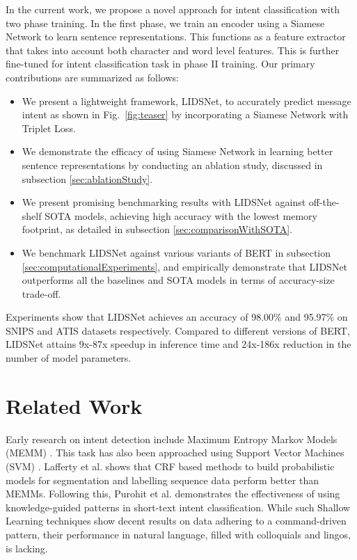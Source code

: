 \documentclass[conference]{IEEEtran}
\begin{document}
In the current work, we propose a novel approach for intent classification with two phase training. In the first phase, we train an encoder using a Siamese Network to learn sentence representations. This functions as a feature extractor that takes into account both character and word level features. This is further fine-tuned for intent classification task in phase II training. Our primary contributions are summarized as follows:

\begin{itemize}
	\item We present a lightweight framework, LIDSNet, to accurately predict message intent as shown in Fig.~\ref{fig:teaser} by incorporating a Siamese Network with Triplet Loss.
	\item We demonstrate the efficacy of using Siamese Network in learning better sentence representations by conducting an ablation study, discussed in subsection \ref{sec:ablationStudy}.
	\item We present promising benchmarking results with LIDSNet against off-the-shelf SOTA models, achieving high accuracy with the lowest memory footprint, as detailed in subsection \ref{sec:comparisonWithSOTA}.
	\item We benchmark LIDSNet against various variants of BERT in subsection \ref{sec:computationalExperiments}, and empirically demonstrate that LIDSNet outperforms all the baselines and SOTA models in terms of accuracy-size trade-off.
\end{itemize}

Experiments show that LIDSNet achieves an accuracy of 98.00\% and 95.97\% on SNIPS and ATIS datasets respectively. Compared to different versions of BERT, LIDSNet attains 9x-87x speedup in inference time and 24x-186x reduction in the number of model parameters.

\section{Related Work}\label{sec:relatedWork}

Early research on intent detection include Maximum Entropy Markov Models (MEMM) \cite{toutanvoa-manning-2000-enriching}. This task has also been approached using Support Vector Machines (SVM) \cite{5947649}. Lafferty et al. \cite{10.5555/645530.655813} shows that CRF based methods to build probabilistic models for segmentation and labelling sequence data perform better than MEMMs. Following this, Purohit et al. \cite{7463729} demonstrates the effectiveness of using knowledge-guided patterns in short-text intent classification. While such Shallow Learning techniques show decent results on data adhering to a command-driven pattern, their performance in natural language, filled with colloquials and lingos, is lacking.
\end{document}
